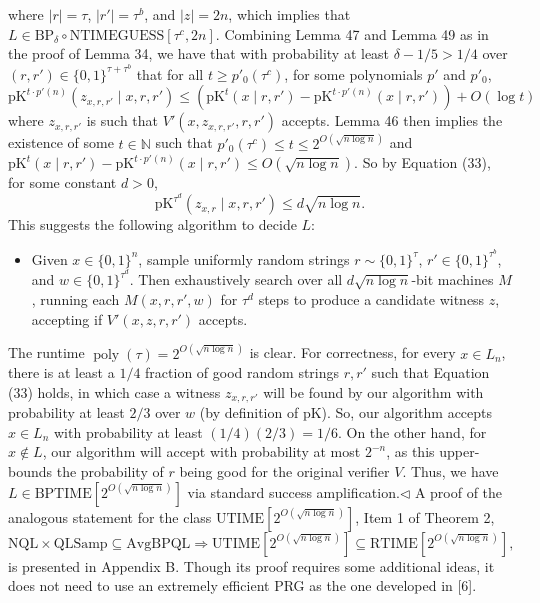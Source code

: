 where $|r|=\tau$, $|r'|=\tau^b$, and $|z|=2n$, which implies that $L\in\mathrm{BP}_\delta\circ\mathrm{NTIMEGUESS}[\tau^c,2n]$.
Combining Lemma 47 and Lemma 49 as in the proof of Lemma 34, we have that with probability at least $\delta-1/5>1/4$ over $(r,r')\in\{0,1\}^{\tau+\tau^b}$ that for all $t\geq p'_0(\tau^c)$, for some polynomials $p'$ and $p'_0$,
\[\mathrm{pK}^{t\cdot p'(n)}(z_{x,r,r'}\mid x,r,r')\leq(\mathrm{pK}^t(x\mid r,r')-\mathrm{pK}^{t\cdot p'(n)}(x\mid r,r'))+O(\log t)\tag{33}\]
where $z_{x,r,r'}$ is such that $V'(x,z_{x,r,r'},r,r')$ accepts. Lemma 46 then implies the existence of some $t\in\mathbb N$ such that $p'_0(\tau^c)\leq t\leq2^{O(\sqrt{n\log n})}$ and $\mathrm{pK}^t(x\mid r,r')-\mathrm{pK}^{t\cdot p'(n)}(x\mid r,r')\leq O(\sqrt{n\log n})$. So by Equation (33), for some constant $d>0$,
\[\mathrm{pK}^{\tau^d}(z_{x,r}\mid x,r,r')\leq d\sqrt{n\log n}.\]
This suggests the following algorithm to decide $L$:
\begin{itemize}
\item Given $x\in\{0,1\}^n$, sample uniformly random strings $r\sim\{0,1\}^\tau$, $r'\in\{0,1\}^{\tau^b}$, and $w\in\{0,1\}^{\tau^d}$. Then exhaustively search over all $d\sqrt{n\log n}$-bit machines $M$, running each $M(x,r,r',w)$ for $\tau^d$ steps to produce a candidate witness $z$, accepting if $V'(x,z,r,r')$ accepts.
\end{itemize}
The runtime $\operatorname{poly}(\tau)=2^{O(\sqrt{n\log n})}$ is clear. For correctness, for every $x\in L_n$, there is at least a $1/4$ fraction of good random strings $r,r'$ such that Equation (33) holds, in which case a witness $z_{x,r,r'}$ will be found by our algorithm with probability at least $2/3$ over $w$ (by definition of pK). So, our algorithm accepts $x\in L_n$ with probability at least $(1/4)(2/3)=1/6$. On the other hand, for $x\notin L$, our algorithm will accept with probability at most $2^{-n}$, as this upper-bounds the probability of $r$ being good for the original verifier $V$. Thus, we have $L\in\mathrm{BPTIME}[2^{O(\sqrt{n\log n})}]$ via standard success amplification.\hfill$\triangleleft$
A proof of the analogous statement for the class $\mathrm{UTIME}[2^{O(\sqrt{n\log n})}]$, Item 1 of Theorem 2,
\[\mathrm{NQL}\times\mathrm{QLSamp}\subseteq\mathrm{AvgBPQL}\Longrightarrow\mathrm{UTIME}[2^{O(\sqrt{n\log n})}]\subseteq\mathrm{RTIME}[2^{O(\sqrt{n\log n})}],\]
is presented in Appendix B. Though its proof requires some additional ideas, it does not need to use an extremely efficient PRG as the one developed in [6].
